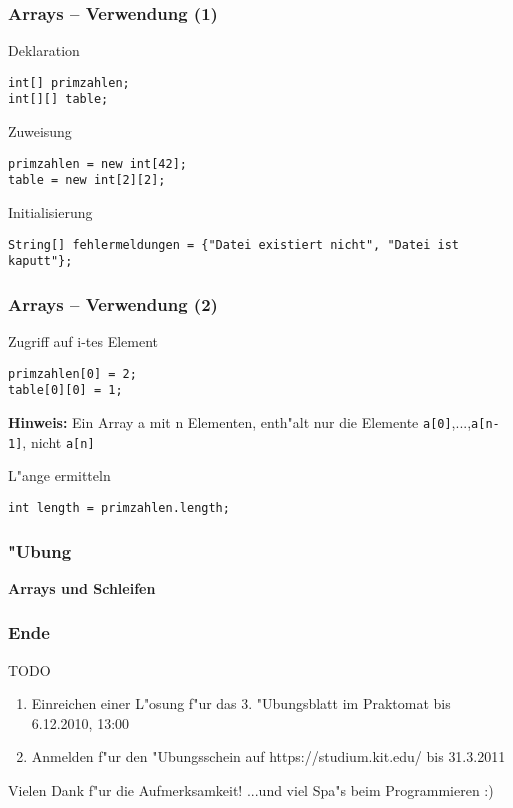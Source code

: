 \documentclass{beamer}
\begin{document}
\begin{frame}[containsverbatim]
\frametitle{Arrays -- Verwendung (1)}
\begin{block}{Deklaration}
\begin{lstlisting}
int[] primzahlen;
int[][] table;
\end{lstlisting}
\end{block}

\begin{block}{Zuweisung}
\begin{lstlisting}
primzahlen = new int[42];
table = new int[2][2];
\end{lstlisting}
\end{block}

\begin{block}{Initialisierung}
\begin{lstlisting}
String[] fehlermeldungen = {"Datei existiert nicht", "Datei ist kaputt"};
\end{lstlisting}
\end{block}
\end{frame}


\begin{frame}[containsverbatim]
\frametitle{Arrays -- Verwendung (2)}
\begin{block}{Zugriff auf i-tes Element}
\begin{lstlisting}
primzahlen[0] = 2;
table[0][0] = 1;
\end{lstlisting}
\textbf{Hinweis:} Ein Array a mit n Elementen, enth"alt nur die Elemente \texttt{a[0]},...,\texttt{a[n-1]}, \alert{nicht} \texttt{a[n]}
\end{block}

\begin{block}{L"ange ermitteln}
\begin{lstlisting}
int length = primzahlen.length;
\end{lstlisting}
\end{block}
\end{frame}


\begin{frame}
\frametitle{"Ubung}
\begin{center}
\textbf{\Huge Arrays und Schleifen}
\end{center}
\end{frame}


\begin{frame}
\frametitle{Ende}
\begin{block}{TODO}
\begin{enumerate}
\item Einreichen einer L"osung f"ur das 3. "Ubungsblatt im Praktomat bis \alert{6.12.2010, 13:00}
\item Anmelden f"ur den "Ubungsschein auf https://studium.kit.edu/ bis \alert{31.3.2011}
\end{enumerate}
\end{block}

\begin{block}{Vielen Dank f"ur die Aufmerksamkeit!}
...und viel Spa"s beim Programmieren :)
\end{block}
\end{frame}
\end{document}
